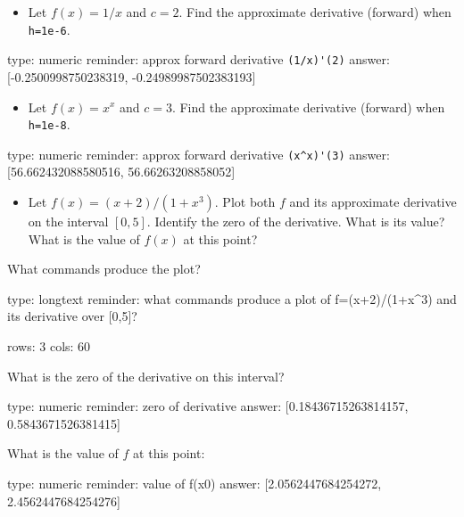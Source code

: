 \documentclass[12pt]{article}
\begin{document}
\begin{itemize}
\itemsep1pt\parskip0pt
\item
  Let $f(x) = 1/x$ and $c=2$. Find the approximate derivative (forward)
  when \texttt{h=1e-6}.
\end{itemize}

\begin{answer}
    type: numeric
    reminder: approx forward derivative \verb+(1/x)'(2)+
    answer: [-0.2500998750238319, -0.24989987502383193]

\end{answer}

\begin{itemize}
\itemsep1pt\parskip0pt
\item
  Let $f(x) = x^x$ and $c=3$. Find the approximate derivative (forward)
  when \texttt{h=1e-8}.
\end{itemize}

\begin{answer}
    type: numeric
    reminder: approx forward derivative \verb+(x^x)'(3)+
    answer: [56.662432088580516, 56.66263208858052]

\end{answer}

\begin{itemize}
\itemsep1pt\parskip0pt
\item
  Let $f(x) = (x + 2)/(1 + x^3)$. Plot both $f$ and its approximate
  derivative on the interval $[0,5]$. Identify the zero of the
  derivative. What is its value? What is the value of $f(x)$ at this
  point?
\end{itemize}

What commands produce the plot?

\begin{answer}
type: longtext
reminder: what commands produce a plot of f=(x+2)/(1+x^3) and its derivative over [0,5]?

rows: 3
cols: 60
\end{answer}

What is the zero of the derivative on this interval?

\begin{answer}
    type: numeric
    reminder: zero of derivative
    answer: [0.18436715263814157, 0.5843671526381415]

\end{answer}

What is the value of $f$ at this point:

\begin{answer}
    type: numeric
    reminder: value of f(x0)
    answer: [2.0562447684254272, 2.4562447684254276]

\end{answer}
\end{document}
